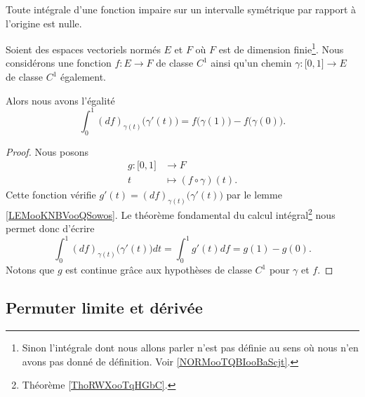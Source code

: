 \begin{remark}
	Toute intégrale d'une fonction impaire sur un intervalle symétrique par rapport à l'origine est nulle.
\end{remark}

\begin{proposition}      \label{PROPooJYIAooXLkbMx}
	Soient des espaces vectoriels normés \( E\) et \( F\) où \( F\) est de dimension finie\footnote{Sinon l'intégrale dont nous allons parler n'est pas définie au sens où nous n'en avons pas donné de définition. Voir \ref{NORMooTQBIooBaScjt}.}. Nous considérons une fonction \( f\colon E\to F\) de classe \( C^1\) ainsi qu'un chemin \( \gamma\colon \mathopen[ 0 , 1 \mathclose]\to E\) de classe \( C^1\) également.

	Alors nous avons l'égalité
	\begin{equation}
		\int_0^1(df)_{\gamma(t)}\big( \gamma'(t) \big)=f\big( \gamma(1) \big)-f\big( \gamma(0) \big).
	\end{equation}
\end{proposition}

\begin{proof}
	Nous posons
	\begin{equation}
		\begin{aligned}
			g\colon \mathopen[ 0 , 1 \mathclose] & \to F                      \\
			t                                    & \mapsto (f\circ\gamma)(t).
		\end{aligned}
	\end{equation}
	Cette fonction vérifie \( g'(t)=(df)_{\gamma(t)}\big( \gamma'(t) \big)\) par le lemme \ref{LEMooKNBVooQSowos}. Le théorème fondamental du calcul intégral\footnote{Théorème \ref{ThoRWXooTqHGbC}.} nous permet donc d'écrire
	\begin{equation}
		\int_0^1(df)_{\gamma(t)}\big( \gamma'(t) \big)dt=\int_0^1g'(t)df=g(1)-g(0).
	\end{equation}
	Notons que \( g\) est continue grâce aux hypothèses de classe \( C^1\) pour \( \gamma\) et \( f\).
\end{proof}

\subsection{Permuter limite et dérivée}

